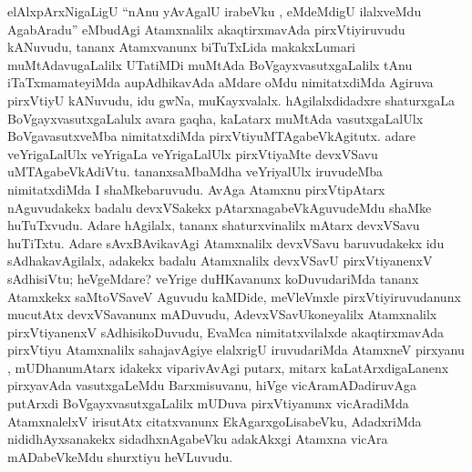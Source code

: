 \centerline{}

\begin{artha}
elAlxpArxNigaLigU ``nAnu yAvAgalU irabeVku , eMdeMdigU ilalxveMdu AgabAradu'' 
eMbudAgi Atamxnalilx akaqtirxmavAda pirxVtiyiruvudu kANuvudu, tananx
Atamxvanunx biTuTxLida makakxLumari muMtAdavugaLalilx UTatiMDi muMtAda
BoVgayxvasutxgaLalilx tAnu iTaTxmamateyiMda aupAdhikavAda aMdare oMdu
nimitatxdiMda Agiruva pirxVtiyU kANuvudu, idu gwNa,
muKayxvalalx. hAgilalxdidadxre shaturxgaLa BoVgayxvasutxgaLalulx avara
gaqha, kaLatarx muMtAda vasutxgaLalUlx BoVgavasutxveMba nimitatxdiMda
pirxVtiyuMTAgabeVkAgitutx. adare veYrigaLalUlx veYrigaLa veYrigaLalUlx
pirxVtiyaMte devxVSavu uMTAgabeVkAdiVtu. tananxsaMbaMdha veYriyalUlx
iruvudeMba nimitatxdiMda I shaMkebaruvudu. AvAga Atamxnu pirxVtipAtarx
nAguvudakekx badalu devxVSakekx pAtarxnagabeVkAguvudeMdu shaMke
huTuTxvudu. Adare hAgilalx, tananx shaturxvinalilx mAtarx devxVSavu
huTiTxtu. Adare sAvxBAvikavAgi Atamxnalilx devxVSavu baruvudakekx idu
sAdhakavAgilalx, adakekx badalu Atamxnalilx devxVSavU pirxVtiyanenxV
sAdhisiVtu; heVgeMdare? veYrige duHKavanunx koDuvudariMda tananx
Atamxkekx saMtoVSaveV Aguvudu kaMDide, meVleVmxle pirxVtiyiruvudanunx
mucutAtx devxVSavanunx mADuvudu, AdevxVSavUkoneyalilx Atamxnalilx
pirxVtiyanenxV sAdhisikoDuvudu, EvaMca nimitatxvilalxde akaqtirxmavAda
pirxVtiyu Atamxnalilx sahajavAgiye elalxrigU iruvudariMda AtamxneV
pirxyanu , mUDhanumAtarx idakekx viparivAvAgi putarx, mitarx
kaLatArxdigaLanenx pirxyavAda vasutxgaLeMdu Barxmisuvanu, hiVge
vicAramADadiruvAga putArxdi BoVgayxvasutxgaLalilx mUDuva pirxVtiyanunx
vicAradiMda AtamxnalelxV irisutAtx citatxvanunx EkAgarxgoLisabeVku,
AdadxriMda nididhAyxsanakekx sidadhxnAgabeVku adakAkxgi Atamxna vicAra mADabeVkeMdu shurxtiyu heVLuvudu.
\end{artha}

